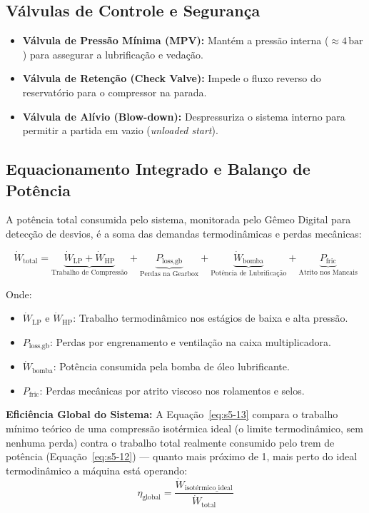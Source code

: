 \documentclass[12pt,a4paper]{article}
\numberwithin{equation}{section}
\numberwithin{table}{section}
\numberwithin{figure}{section}
\begin{document}
	\subsection{\textbf{Válvulas de Controle e Segurança}}
	\begin{itemize}
		\item \textbf{Válvula de Pressão Mínima (MPV):} Mantém a pressão interna ($\approx 4\,\text{bar}$) para assegurar a lubrificação e vedação.
		\item \textbf{Válvula de Retenção (Check Valve):} Impede o fluxo reverso do reservatório para o compressor na parada.
		\item \textbf{Válvula de Alívio (Blow-down):} Despressuriza o sistema interno para permitir a partida em vazio (\textit{unloaded start}).
	\end{itemize}
	
	\subsection{\textbf{Equacionamento Integrado e Balanço de Potência}}
	A potência total consumida pelo sistema, monitorada pelo Gêmeo Digital para detecção de desvios, é a soma das demandas termodinâmicas e perdas mecânicas:
	
	\begin{equation}\label{eq:s5-12}
	\dot{W}_{\text{total}} = \underbrace{\dot{W}_{\text{LP}} + \dot{W}_{\text{HP}}}_{\text{Trabalho de Compressão}} + \underbrace{P_{\text{loss,gb}}}_{\text{Perdas na Gearbox}} + \underbrace{\dot{W}_{\text{bomba}}}_{\text{Potência de Lubrificação}} + \underbrace{P_{\text{fric}}}_{\text{Atrito nos Mancais}}
\end{equation}
	
	Onde:
	\begin{itemize}
		\item $\dot{W}_{\text{LP}}$ e $\dot{W}_{\text{HP}}$: Trabalho termodinâmico nos estágios de baixa e alta pressão.
		\item $P_{\text{loss,gb}}$: Perdas por engrenamento e ventilação na caixa multiplicadora.
		\item $\dot{W}_{\text{bomba}}$: Potência consumida pela bomba de óleo lubrificante.
		\item $P_{\text{fric}}$: Perdas mecânicas por atrito viscoso nos rolamentos e selos.
	\end{itemize}
	
	\vspace{1em}
	\textbf{Eficiência Global do Sistema:} A Equação~\eqref{eq:s5-13} compara o trabalho mínimo teórico de uma compressão isotérmica ideal (o limite termodinâmico, sem nenhuma perda) contra o trabalho total realmente consumido pelo trem de potência (Equação~\eqref{eq:s5-12}) — quanto mais próximo de 1, mais perto do ideal termodinâmico a máquina está operando:
	\begin{equation}\label{eq:s5-13}
 \eta_{\text{global}} = \frac{\dot{W}_{\text{isotérmico\_ideal}}}{\dot{W}_{\text{total}}}
\end{equation}
\end{document}
